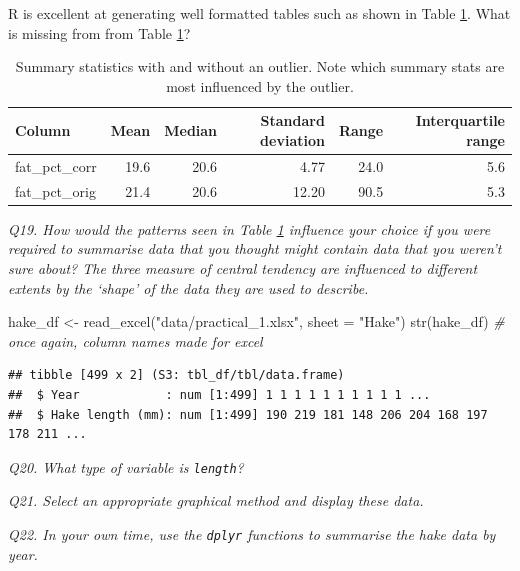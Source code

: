 \documentclass[
  11pt,
  a4paper,
]{book}
\newenvironment{Shaded}{\begin{snugshade}}{\end{snugshade}}
\newcommand{\AttributeTok}[1]{\textcolor[rgb]{0.77,0.63,0.00}{#1}}
\newcommand{\CommentTok}[1]{\textcolor[rgb]{0.56,0.35,0.01}{\textit{#1}}}
\newcommand{\FunctionTok}[1]{\textcolor[rgb]{0.00,0.00,0.00}{#1}}
\newcommand{\NormalTok}[1]{#1}
\newcommand{\OtherTok}[1]{\textcolor[rgb]{0.56,0.35,0.01}{#1}}
\newcommand{\StringTok}[1]{\textcolor[rgb]{0.31,0.60,0.02}{#1}}
\begin{document}
R is excellent at generating well formatted tables such as shown in Table \ref{tab:scallop-table}. What is missing from from Table \ref{tab:scallop-table}?

\begin{table}

\caption{\label{tab:scallop-table}Summary statistics with and without an outlier. Note which summary stats are most influenced by the outlier.}
\centering
\begin{tabular}[t]{lrrrrr}
\toprule
Column & Mean & Median & Standard deviation & Range & Interquartile range\\
\midrule
fat\_pct\_corr & 19.6 & 20.6 & 4.77 & 24.0 & 5.6\\
fat\_pct\_orig & 21.4 & 20.6 & 12.20 & 90.5 & 5.3\\
\bottomrule
\end{tabular}
\end{table}

\emph{Q19. How would the patterns seen in Table \ref{tab:scallop-table} influence your choice if you were required to summarise data that you thought might contain data that you weren't sure about? The three measure of central tendency are influenced to different extents by the `shape' of the data they are used to describe.}

\begin{Shaded}
\begin{Highlighting}[]
\NormalTok{hake\_df }\OtherTok{\textless{}{-}} \FunctionTok{read\_excel}\NormalTok{(}\StringTok{"data/practical\_1.xlsx"}\NormalTok{, }\AttributeTok{sheet =} \StringTok{"Hake"}\NormalTok{)}
\FunctionTok{str}\NormalTok{(hake\_df) }\CommentTok{\# once again, column names made for excel}
\end{Highlighting}
\end{Shaded}

\begin{verbatim}
## tibble [499 x 2] (S3: tbl_df/tbl/data.frame)
##  $ Year            : num [1:499] 1 1 1 1 1 1 1 1 1 1 ...
##  $ Hake length (mm): num [1:499] 190 219 181 148 206 204 168 197 178 211 ...
\end{verbatim}

\emph{Q20. What type of variable is \texttt{length}?}

\emph{Q21. Select an appropriate graphical method and display these data.}

\emph{Q22. In your own time, use the \texttt{dplyr} functions to summarise the hake data by year.}
\end{document}
